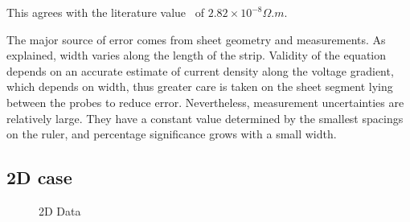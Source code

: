 \documentclass[12pt]{IEEEtran}
\begin{document}
This agrees with the literature value~\cite{al} of $2.82 \times 10^{-8} \unit{\Omega.m}$.

The major source of error comes from sheet geometry and measurements. As explained, width varies along the length of the strip. Validity of the equation depends on an accurate estimate of current density along the voltage gradient, which depends on width, thus greater care is taken on the sheet segment lying between the probes to reduce error. Nevertheless, measurement uncertainties are relatively large. They have a constant value determined by the smallest spacings on the ruler, and percentage significance grows with a small width.

\subsection{2D case}

\begin{figure}[h]
\begin{center}\label{2ddata}
\caption{2D Data}
\end{center}
\end{figure}
\end{document}
